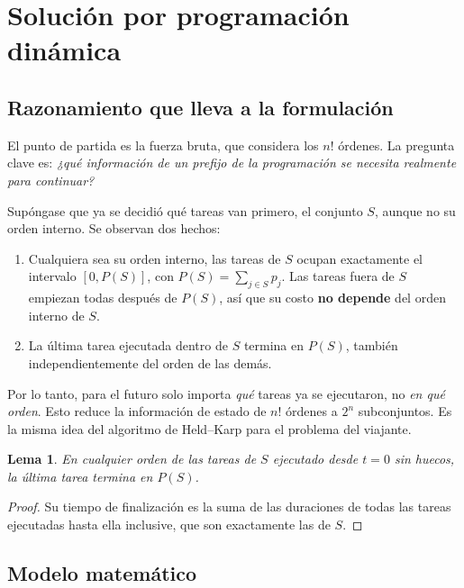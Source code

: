 \documentclass[10pt,twocolumn,letterpaper]{article}
\newtheorem{lema}{Lema}
\begin{document}
\section{Solución por programación dinámica}\label{sec:dp}

\subsection{Razonamiento que lleva a la formulación}

El punto de partida es la fuerza bruta, que considera los $n!$ órdenes. La
pregunta clave es: \emph{¿qué información de un prefijo de la programación se
necesita realmente para continuar?}

Supóngase que ya se decidió qué tareas van primero, el conjunto $S$, aunque no
su orden interno. Se observan dos hechos:

\begin{enumerate}
  \item Cualquiera sea su orden interno, las tareas de $S$ ocupan exactamente
        el intervalo $[0,P(S)]$, con $P(S)=\sum_{j\in S}p_j$. Las tareas
        fuera de $S$ empiezan todas después de $P(S)$, así que su costo
        \textbf{no depende} del orden interno de $S$.
  \item La última tarea ejecutada dentro de $S$ termina en $P(S)$, también
        independientemente del orden de las demás.
\end{enumerate}

Por lo tanto, para el futuro solo importa \emph{qué} tareas ya se ejecutaron,
no \emph{en qué orden}. Esto reduce la información de estado de $n!$ órdenes a
$2^n$ subconjuntos. Es la misma idea del algoritmo de Held--Karp para el
problema del viajante.

\begin{lema}\label{lema:fin}
En cualquier orden de las tareas de $S$ ejecutado desde $t=0$ sin huecos, la
última tarea termina en $P(S)$.
\end{lema}

\begin{proof}
Su tiempo de finalización es la suma de las duraciones de todas las tareas
ejecutadas hasta ella inclusive, que son exactamente las de $S$.
\end{proof}

\subsection{Modelo matemático}
\end{document}
